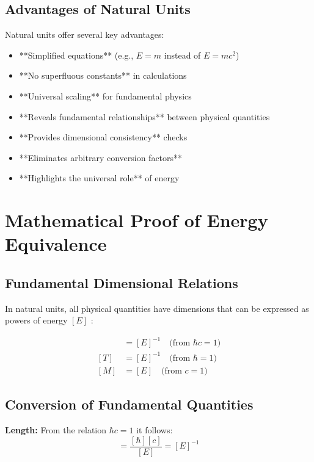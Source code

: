 	\subsection{Advantages of Natural Units}
	
	Natural units offer several key advantages:
	\begin{itemize}
		\item **Simplified equations** (e.g., $E = m$ instead of $E = mc^2$)
		\item **No superfluous constants** in calculations
		\item **Universal scaling** for fundamental physics
		\item **Reveals fundamental relationships** between physical quantities
		\item **Provides dimensional consistency** checks
		\item **Eliminates arbitrary conversion factors**
		\item **Highlights the universal role** of energy
	\end{itemize}
	
	\section{Mathematical Proof of Energy Equivalence}
	
	\subsection{Fundamental Dimensional Relations}
	
	In natural units, all physical quantities have dimensions that can be expressed as powers of energy $[E]$ \cite{weinberg1995,peskin1995}:
	
	\begin{align}
		[L] &= [E]^{-1} \quad \text{(from } \hbar c = 1\text{)} \\
		[T] &= [E]^{-1} \quad \text{(from } \hbar = 1\text{)} \\
		[M] &= [E] \quad \text{(from } c = 1\text{)}
	\end{align}
	
	\subsection{Conversion of Fundamental Quantities}
	
	\textbf{Length:} From the relation $\hbar c = 1$ it follows:
	\begin{equation}
		[L] = \frac{[\hbar][c]}{[E]} = [E]^{-1}
	\end{equation}
	
